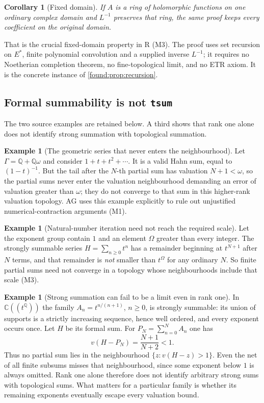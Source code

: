 \documentclass[11pt,letterpaper]{article}
\numberwithin{equation}{section}
\newtheorem{corollary}[theorem]{Corollary}
\theoremstyle{definition}
\newtheorem{example}[theorem]{Example}
\theoremstyle{remark}
\newcommand{\C}{\mathbb C}
\newcommand{\Q}{\mathbb Q}
\begin{document}
\begin{corollary}[Fixed domain]\label{found:cor:fixeddomain}
If $A$ is a ring of holomorphic functions on one ordinary complex domain and
$L^{-1}$ preserves that ring, the same proof keeps every coefficient on the
original domain.
\end{corollary}

That is the crucial fixed-domain property in R (M3). The proof uses set
recursion on $E^*$, finite polynomial convolution and a supplied inverse
$L^{-1}$; it requires no Noetherian completion theorem, no fine-topological
limit, and no ETR axiom. It is the concrete instance of
\cref{found:prop:recursion}.

\subsection{Formal summability is not \texttt{tsum}}
\label{found:sub:tsum}
The two source examples are retained below. A third shows that rank one alone
does not identify strong summation with topological summation.

\begin{example}[The geometric series that never enters the neighbourhood]\label{found:ex:geometric}
Let $\Gamma=\Q+\Q\omega$ and consider $1+t+t^2+\cdots$. It is a valid Hahn sum,
equal to $(1-t)^{-1}$. But the tail after the $N$-th partial sum has valuation
$N+1<\omega$, so the partial sums never enter the valuation neighbourhood
demanding an error of valuation greater than $\omega$; they do not converge to
that sum in this higher-rank valuation topology. AG uses this example explicitly
to rule out unjustified numerical-contraction arguments (M1).
\end{example}

\begin{example}[Natural-number iteration need not reach the required scale]\label{found:ex:archimedean}
Let the exponent group contain $1$ and an element $\Omega$ greater than every
integer. The strongly summable series $H=\sum_{n\ge0}t^n$ has a remainder
beginning at $t^{N+1}$ after $N$ terms, and that remainder is \emph{not} smaller
than $t^\Omega$ for any ordinary $N$. So finite partial sums need not converge
in a topology whose neighbourhoods include that scale (M3).
\end{example}

\begin{example}[Strong summation can fail to be a limit even in rank one]
\label{found:ex:boundedrankone}
In $\C((t^\Q))$ the family $A_n=t^{n/(n+1)}$, $n\ge0$, is strongly summable:
its union of supports is a strictly increasing sequence, hence well ordered,
and every exponent occurs once. Let $H$ be its formal sum. For
$P_N=\sum_{n=0}^N A_n$ one has
\[
 v(H-P_N)=\frac{N+1}{N+2}<1.
\]
Thus no partial sum lies in the neighbourhood $\{z:v(H-z)>1\}$. Even the net
of all finite subsums misses that neighbourhood, since some exponent below
$1$ is always omitted. Rank one alone therefore does not identify arbitrary
strong sums with topological sums. What matters for a particular family is
whether its remaining exponents eventually escape every valuation bound.
\end{example}
\end{document}
